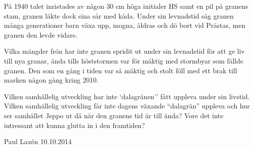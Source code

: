 På 1940 talet inristades av någon 30 cm höga initialer HS samt en pil på granens stam, granen läkte dock sina sår med kåda. Under sin levnadstid såg granen många generationer barn växa upp, mogna, åldras och dö bort vid Prästas, men granen den levde vidare.

Vilka mängder frön har inte granen spridit ut under sin levnadstid för att ge liv till nya granar, ända tills höststormen var för mäktig med stormbyar som fällde granen. Den som en gång i tiden var så mäktig och stolt föll med ett brak till marken någon gång kring 2010.

Vilken samhällelig utveckling har inte `dalagränen'' fått uppleva under sin livstid. Vilken samhällelig utveckling får inte dagens växande ``dalagrän'' uppleva och hur ser samhället Jeppo ut då när den granens tid är till ända? Vore det inte intressant att kunna glutta in i den framtiden?

Paul Laxén 10.10.2014
